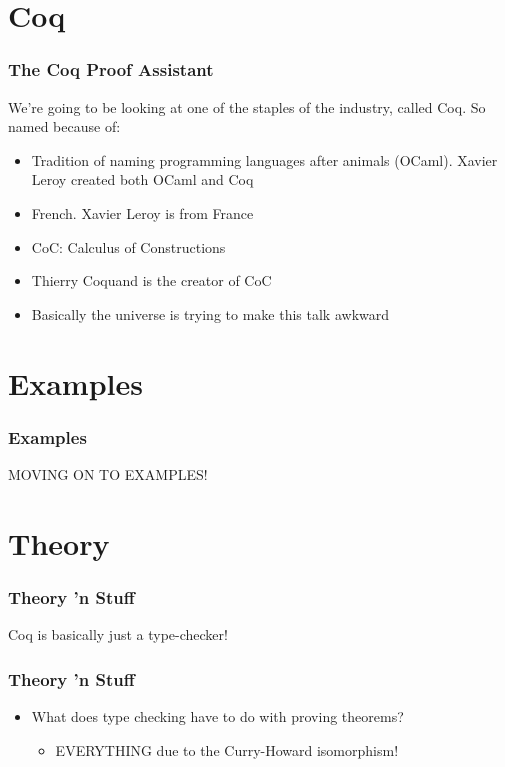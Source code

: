 \documentclass{beamer}
\begin{document}
\section{Coq}

\begin{frame}
  \frametitle{The Coq Proof Assistant}

  We're going to be looking at one of the staples of the industry, called Coq. So named because of:

  \begin{itemize}
  \item<1-> Tradition of naming programming languages after animals (OCaml). Xavier Leroy created both OCaml and Coq
  \item<2-> French. Xavier Leroy is from France
  \item<3-> CoC: Calculus of Constructions
  \item<4-> Thierry Coquand is the creator of CoC
  \item<5-> Basically the universe is trying to make this talk awkward
  \end{itemize}
\end{frame}

\section{Examples}

\begin{frame}
  \frametitle{Examples}

  \alert{\huge{MOVING ON TO EXAMPLES!}}
\end{frame}

\section{Theory}

\begin{frame}
  \frametitle{Theory 'n Stuff}

 \alert{\huge{Coq is basically just a type-checker!}}

\end{frame}

\begin{frame}
  \frametitle{Theory 'n Stuff}

  \begin{itemize}
  \item<1-> What does type checking have to do with proving theorems?

    \begin{itemize}
    \item \alert{EVERYTHING due to the Curry-Howard isomorphism!}
    \end{itemize}

  \end{itemize}

\end{frame}
\end{document}

